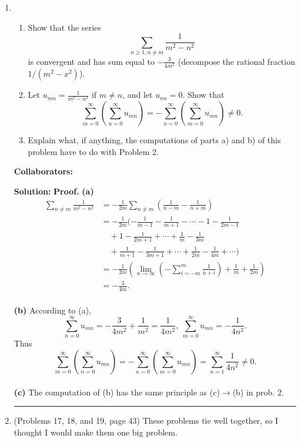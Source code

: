 \documentclass{article}%
\newenvironment{proof}[1][Proof]{\textbf{#1.} }{\ \rule{0.5em}{0.5em}}
\begin{document}
\begin{enumerate}
\item \begin{enumerate}
\item Show that the series \[
\sum_{n\geq 1, n\neq m} \frac{1}{m^2 - n^2}\]is convergent and has sum equal to $-\frac{3}{4m^2}$ (decompose the rational fraction $1/(m^2 - x^2)$).
\item Let $u_{mn} = \frac{1}{m^2 - n^2}$ if $m\neq n$, and let $u_{nn} = 0$. Show that \[
\sum_{m=0}^{\infty}\left(\sum_{n=0}^{\infty} u_{mn}\right) = -\sum_{n=0}^{\infty}\left(\sum_{m=0}^{\infty} u_{mn}\right) \neq 0.\]
\item Explain what, if anything, the computations of parts a) and b) of this problem have to do with Problem 2.
\end{enumerate}


\bigskip
\textbf{Collaborators:}\\
\smallskip
 
\textbf{Solution:}
\begin{proof}
\textbf{(a)} \\[2pt]
$$
\begin{aligned}
\sum_{n\ne m}\frac{1}{m^2-n^2} &= -\frac{1}{2m}\sum_{n\ne m}\left(\frac{1}{n-m}-\frac{1}{n+m} \right)\\
&=-\frac{1}{2m}(-\frac{1}{m-1}-\frac{1}{m+1}-\cdots-1-\frac{1}{2m-1}\\
&\quad + 1-\frac{1}{2m+1}+\cdots+\frac{1}{m}-\frac{1}{3m}\\
&\quad + \frac{1}{m+1}-\frac{1}{3m+1}+\cdots+\frac{1}{2m}-\frac{1}{4m}+\cdots) \\
&= -\frac{1}{2m}\left(\lim_{n\to\infty}(-\sum_{i=-m}^{m}\frac{1}{n+i}) + \frac{1}{m} + \frac{1}{2m}\right) \\
&= -\frac{3}{4m}.
\end{aligned}
$$
\\
\textbf{(b)} 
According to (a),
$$
\sum_{n=0}^{\infty}u_{mn} = -\frac{3}{4m^2}+\frac{1}{m^2} = \frac{1}{4m^2}, ~\sum_{m=0}^{\infty}u_{mn} = -\frac{1}{4n^2}.
$$
Thus
$$
\sum_{m=0}^{\infty}\left(\sum_{n=0}^{\infty} u_{mn}\right) = -\sum_{n=0}^{\infty}\left(\sum_{m=0}^{\infty} u_{mn}\right) = \sum_{n=1}^{\infty}\frac{1}{4n^2}\ne 0.
$$
\\
\textbf{(c)}
The computation of (b) has the same principle as (c)$\to$(b) in prob. 2.
\end{proof}
\bigskip



\item (Problems 17, 18, and 19, page 43) These problems tie well together, so I thought I would make them one big problem.


\end{enumerate}
\end{document}

